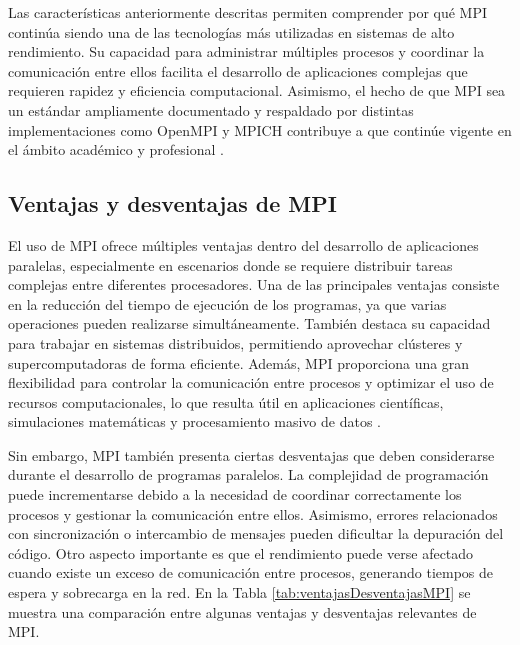 Las características anteriormente descritas permiten comprender por qué MPI continúa siendo una de las tecnologías más utilizadas en sistemas de alto rendimiento. Su capacidad para administrar múltiples procesos y coordinar la comunicación entre ellos facilita el desarrollo de aplicaciones complejas que requieren rapidez y eficiencia computacional. Asimismo, el hecho de que MPI sea un estándar ampliamente documentado y respaldado por distintas implementaciones como OpenMPI y MPICH contribuye a que continúe vigente en el ámbito académico y profesional \cite{ref7_frem,ref8_frem}.

\subsection{Ventajas y desventajas de MPI}

El uso de MPI ofrece múltiples ventajas dentro del desarrollo de aplicaciones paralelas, especialmente en escenarios donde se requiere distribuir tareas complejas entre diferentes procesadores. Una de las principales ventajas consiste en la reducción del tiempo de ejecución de los programas, ya que varias operaciones pueden realizarse simultáneamente. También destaca su capacidad para trabajar en sistemas distribuidos, permitiendo aprovechar clústeres y supercomputadoras de forma eficiente. Además, MPI proporciona una gran flexibilidad para controlar la comunicación entre procesos y optimizar el uso de recursos computacionales, lo que resulta útil en aplicaciones científicas, simulaciones matemáticas y procesamiento masivo de datos \cite{ref2_frem,ref1_frem}.

Sin embargo, MPI también presenta ciertas desventajas que deben considerarse durante el desarrollo de programas paralelos. La complejidad de programación puede incrementarse debido a la necesidad de coordinar correctamente los procesos y gestionar la comunicación entre ellos. Asimismo, errores relacionados con sincronización o intercambio de mensajes pueden dificultar la depuración del código. Otro aspecto importante es que el rendimiento puede verse afectado cuando existe un exceso de comunicación entre procesos, generando tiempos de espera y sobrecarga en la red. En la Tabla \ref{tab:ventajasDesventajasMPI} se muestra una comparación entre algunas ventajas y desventajas relevantes de MPI.

